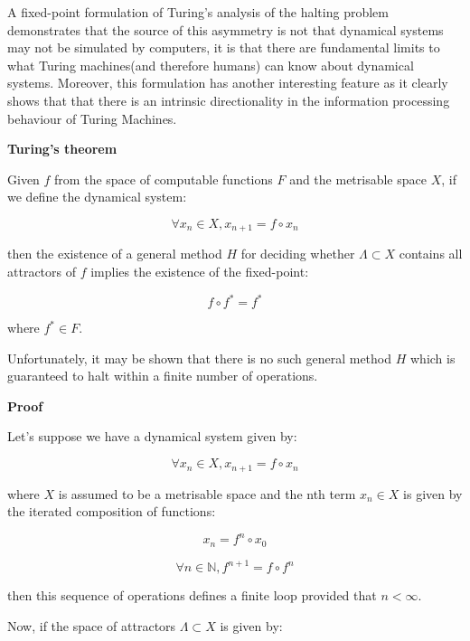 \documentclass{article}
\begin{document}
A fixed-point formulation of Turing's analysis of the halting problem demonstrates that the source of this asymmetry is not that dynamical systems may not be simulated by computers, it is that there are fundamental limits to what Turing machines(and therefore humans) can know about dynamical systems. Moreover, this formulation has another interesting feature as it clearly shows that that there is an intrinsic directionality in the information processing behaviour of Turing Machines.

\textbf{Turing's theorem}

Given $f$ from the space of computable functions $F$ and the metrisable space $X$, if we define the dynamical system:

\begin{equation}
\forall x_n \in X, x_{n+1} = f \circ x_n
\end{equation}

then the existence of a general method $H$ for deciding whether $\Lambda \subset X$ contains all attractors of $f$ implies the existence of the fixed-point:

\begin{equation}
f \circ f^* = f^*
\end{equation}

where $f^* \in F$.

Unfortunately, it may be shown that there is no such general method $H$ which is guaranteed to halt within a finite number of operations.

\textbf{Proof}

Let's suppose we have a dynamical system given by:

\begin{equation}
\forall x_n \in X, x_{n+1} = f \circ x_n
\end{equation}

where $X$ is assumed to be a metrisable space and the nth term $x_n \in X$ is given by the iterated composition of functions:

\begin{equation}
x_n = f^n \circ x_0
\end{equation}

\begin{equation}
\forall n \in \mathbb{N}, f^{n+1} = f \circ f^n
\end{equation}

then this sequence of operations defines a finite loop provided that $n < \infty$.

Now, if the space of attractors $\Lambda \subset X$ is given by:
\end{document}
